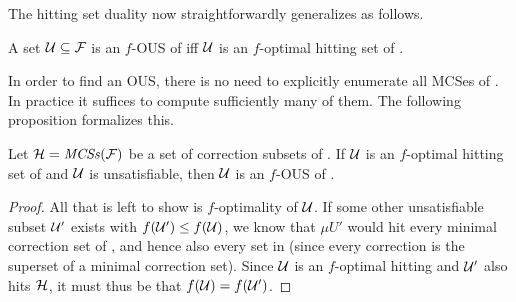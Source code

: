 The hitting set duality now straightforwardly generalizes as follows. 

\begin{proposition}\label{prop:optimal-hitting-set}
  A set $\mathcal{U} \subseteq \mathcal{F} $ is an $f$-OUS of \formula iff $\mathcal{U}$ is an $f$-optimal hitting set of \mcses{\formula}.
\end{proposition}
 

In order to find an OUS, there is no need to explicitly enumerate all MCSes of \formula. In practice it suffices to compute sufficiently many of them. 
The following proposition formalizes this. 
% 

\begin{proposition}\label{prop:K}
  Let $\mathcal{H}=\mathit{MCSs}(\mathcal{F} )$ be a set of correction subsets of \formula {} . 
  If $\mathcal{U}$ is an $f$-optimal hitting set of  and $\mathcal{U}$ is unsatisfiable, then $\mathcal{U}$ is an $f$-OUS of \formula. 
\end{proposition}
\begin{proof}
  All that is left to show is $f$-optimality of $\mathcal{U}$.
  If some other unsatisfiable subset $\mathcal{U}'$ exists with $f(\mathcal{U}')\leq f(\mathcal{U})$, we know that $\mu{U}'$ would hit every minimal correction set of , and hence also every set in  (since every correction is the superset of a minimal correction set).
  Since $\mathcal{U}$ is an $f$-optimal hitting and $\mathcal{U}'$ also hits $\mathcal{H}$, it must thus be that $f(\mathcal{U})=f(\mathcal{U'})$. 
%   
\end{proof}




